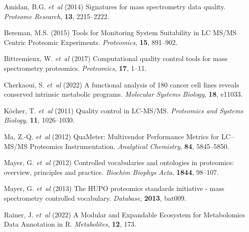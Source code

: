 \documentclass{bioinfo}
\begin{document}
\begin{thebibliography}{}

Amidan, B.G. \textit{et~al} (2014) Signatures for mass spectrometry data
quality.
\textit{Proteome Research}, \textbf{13}, 2215--2222.

Bereman, M.S. (2015) Tools for Monitoring System Suitability in LC MS/MS
Centric Proteomic Experiments.
\textit{Proteomics}, \textbf{15}, 891--902.

Bittremieux, W. \textit{et~al} (2017) Computational quality control tools for
mass spectrometry proteomics.
\textit{Proteomics}, \textbf{17}, 1--11.

Cherkaoui, S. \textit{et~al} (2022) A functional analysis of 180 cancer cell
lines reveals conserved intrinsic metabolic programs.
\textit{Molecular Systems Biology}, \textbf{18}, e11033.

K\"ocher, T. \textit{et~al} (2011) Quality control in LC-MS/MS.
\textit{Proteomics and Systems Biology}, \textbf{11}, 1026--1030.


Ma, Z.-Q. \textit{et~al} (2012) QuaMeter: Multivendor Performance Metrics
for LC–MS/MS Proteomics Instrumentation.
\textit{Analytical Chemistry}, \textbf{84}, 5845--5850.

Mayer, G. \textit{et~al} (2012) Controlled vocabularies and ontologies in 
proteomics: overview, principles and practice.
\textit{Biochim Biophys Acta}, \textbf{1844}, 98--107.

Mayer, G. \textit{et~al} (2013) The HUPO proteomics standards initiative - 
mass spectrometry controlled vocabulary.
\textit{Database}, \textbf{2013}, bat009.



Rainer, J. \textit{et~al} (2022) A Modular and Expandable Ecosystem for Metabolomics Data Annotation in R.
\textit{Metabolites}, \textbf{12}, 173.

\end{thebibliography}


%
%
%
%
%

%


\end{document}
